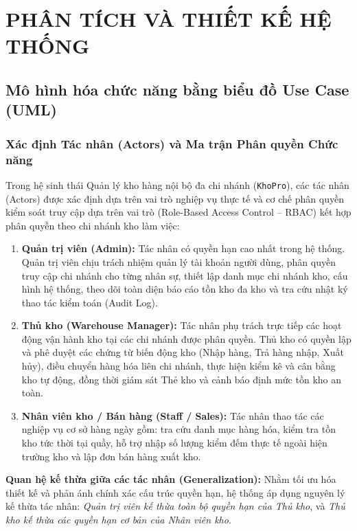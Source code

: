 \documentclass[12pt,a4paper]{report}
\renewcommand{\_}{\textunderscore\allowbreak}
\begin{document}
\cleardoublepage

\chapter{PHÂN TÍCH VÀ THIẾT KẾ HỆ THỐNG}

\section{Mô hình hóa chức năng bằng biểu đồ Use Case (UML)}

\subsection{Xác định Tác nhân (Actors) và Ma trận Phân quyền Chức năng}

Trong hệ sinh thái Quản lý kho hàng nội bộ đa chi nhánh (\texttt{KhoPro}), các tác nhân (Actors) được xác định dựa trên vai trò nghiệp vụ thực tế và cơ chế phân quyền kiểm soát truy cập dựa trên vai trò (Role-Based Access Control -- RBAC) kết hợp phân quyền theo chi nhánh kho làm việc:

\begin{enumerate}[leftmargin=1.5cm]
    \item \textbf{Quản trị viên (Admin):} Tác nhân có quyền hạn cao nhất trong hệ thống. Quản trị viên chịu trách nhiệm quản lý tài khoản người dùng, phân quyền truy cập chi nhánh cho từng nhân sự, thiết lập danh mục chi nhánh kho, cấu hình hệ thống, theo dõi toàn diện báo cáo tồn kho đa kho và tra cứu nhật ký thao tác kiểm toán (Audit Log).
    \item \textbf{Thủ kho (Warehouse Manager):} Tác nhân phụ trách trực tiếp các hoạt động vận hành kho tại các chi nhánh được phân quyền. Thủ kho có quyền lập và phê duyệt các chứng từ biến động kho (Nhập hàng, Trả hàng nhập, Xuất hủy), điều chuyển hàng hóa liên chi nhánh, thực hiện kiểm kê và cân bằng kho tự động, đồng thời giám sát Thẻ kho và cảnh báo định mức tồn kho an toàn.
    \item \textbf{Nhân viên kho / Bán hàng (Staff / Sales):} Tác nhân thao tác các nghiệp vụ cơ sở hàng ngày gồm: tra cứu danh mục hàng hóa, kiểm tra tồn kho tức thời tại quầy, hỗ trợ nhập số lượng kiểm đếm thực tế ngoài hiện trường kho và lập đơn bán hàng xuất kho.
\end{enumerate}

\textbf{Quan hệ kế thừa giữa các tác nhân (Generalization):} Nhằm tối ưu hóa thiết kế và phản ánh chính xác cấu trúc quyền hạn, hệ thống áp dụng nguyên lý kế thừa tác nhân: \textit{Quản trị viên kế thừa toàn bộ quyền hạn của Thủ kho}, và \textit{Thủ kho kế thừa các quyền hạn cơ bản của Nhân viên kho}.
\end{document}
